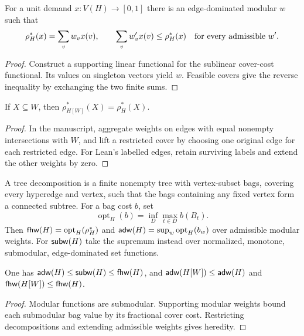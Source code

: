 \begin{lemma}
\label{eq:cover-dual}
\leanok
For a unit demand $x:V(H)\to[0,1]$ there is an edge-dominated modular $w$
such that
\[
 \rho_H^*(x)=\sum_v w_vx(v),
 \qquad \sum_v w'_vx(v)\le\rho_H^*(x)
 \quad\hbox{for every admissible }w'.
\]
\end{lemma}
\begin{proof}\leanok
Construct a supporting linear functional for the sublinear cover-cost
functional. Its values on singleton vectors yield $w$. Feasible covers give
the reverse inequality by exchanging the two finite sums.
\end{proof}

\begin{lemma}
\label{eq:cover-restriction}
\leanok
If $X\subseteq W$, then $\rho_{H[W]}^*(X)=\rho_H^*(X)$.
\end{lemma}
\begin{proof}\leanok
In the manuscript, aggregate weights on edges with equal nonempty
intersections with $W$, and lift a restricted cover by choosing one original
edge for each restricted edge. For Lean's labelled edges, retain surviving
labels and extend the other weights by zero.
\end{proof}

\begin{definition}
\label{def:widths}
\leanok
A tree decomposition is a finite nonempty tree with vertex-subset bags,
covering every hyperedge and vertex, such that the bags containing any fixed
vertex form a connected subtree. For a bag cost $b$, set
\[
 \operatorname{opt}_H(b)=\inf_D\max_{t\in D}b(B_t).
\]
Then $\mathsf{fhw}(H)=\operatorname{opt}_H(\rho_H^*)$ and
$\mathsf{adw}(H)=\sup_w\operatorname{opt}_H(b_w)$ over admissible modular weights.
For $\mathsf{subw}(H)$ take the supremum instead over normalized, monotone,
submodular, edge-dominated set functions.
\end{definition}

\begin{lemma}
\label{prop:width-hierarchy}
\leanok
One has $\mathsf{adw}(H)\le\mathsf{subw}(H)\le\mathsf{fhw}(H)$, and
$\mathsf{adw}(H[W])\le\mathsf{adw}(H)$ and $\mathsf{fhw}(H[W])\le\mathsf{fhw}(H)$.
\end{lemma}
\begin{proof}\leanok
Modular functions are submodular. Supporting modular weights bound each
submodular bag value by its fractional cover cost. Restricting decompositions
and extending admissible weights gives heredity.
\end{proof}

